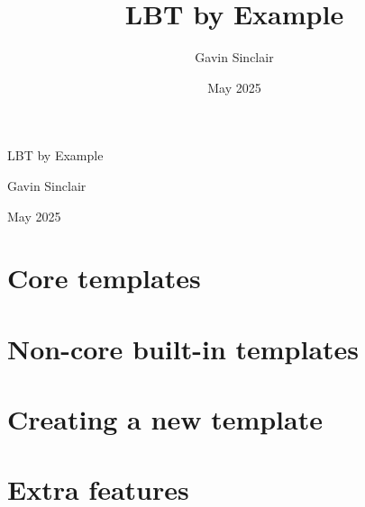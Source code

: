 \documentclass[12pt,oneside]{memoir}
\title{LBT by Example}
\author{Gavin Sinclair}
\date{May 2025}
\begin{document}

\frontmatter  %

\begin{titlingpage}
  \centering
  \vspace*{3cm}
  {\Huge LBT by Example\par}
  \vspace{1cm}
  {\large Gavin Sinclair\par}
  \vfill
  {\large May 2025\par}
\end{titlingpage}

\tableofcontents*
{}




\mainmatter   %

\part{Core templates}





\part{Non-core built-in templates}



\part{Creating a new template}

\part{Extra features}

\appendix

\backmatter
\end{document}
